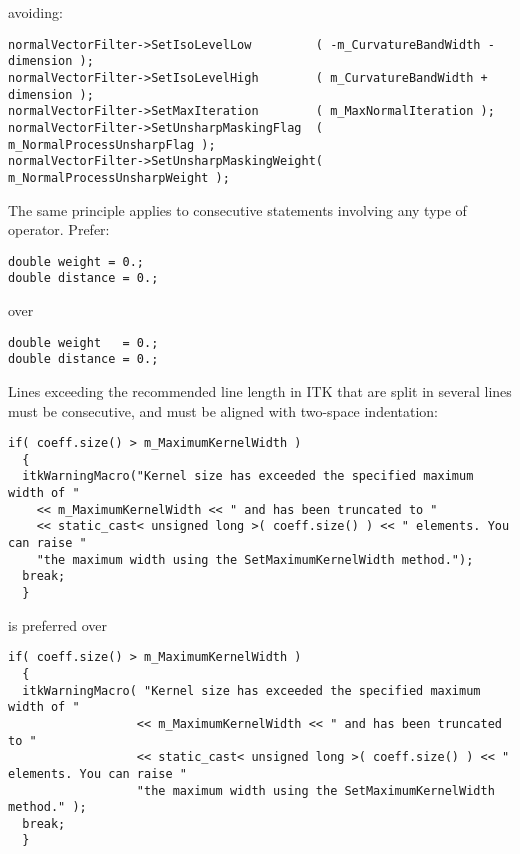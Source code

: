 avoiding:

\small
\begin{verbatim}
normalVectorFilter->SetIsoLevelLow         ( -m_CurvatureBandWidth - dimension );
normalVectorFilter->SetIsoLevelHigh        ( m_CurvatureBandWidth + dimension );
normalVectorFilter->SetMaxIteration        ( m_MaxNormalIteration );
normalVectorFilter->SetUnsharpMaskingFlag  ( m_NormalProcessUnsharpFlag );
normalVectorFilter->SetUnsharpMaskingWeight( m_NormalProcessUnsharpWeight );
\end{verbatim}
\normalsize

The same principle applies to consecutive statements involving any type of
operator. Prefer:

\small
\begin{verbatim}
double weight = 0.;
double distance = 0.;
\end{verbatim}
\normalsize

over

\small
\begin{verbatim}
double weight   = 0.;
double distance = 0.;
\end{verbatim}
\normalsize

Lines exceeding the recommended line length in ITK that are split in several
lines must be consecutive, and must be aligned with two-space indentation:

\small
\begin{verbatim}
if( coeff.size() > m_MaximumKernelWidth )
  {
  itkWarningMacro("Kernel size has exceeded the specified maximum width of "
    << m_MaximumKernelWidth << " and has been truncated to "
    << static_cast< unsigned long >( coeff.size() ) << " elements. You can raise "
    "the maximum width using the SetMaximumKernelWidth method.");
  break;
  }
\end{verbatim}
\normalsize

is preferred over

\small
\begin{verbatim}
if( coeff.size() > m_MaximumKernelWidth )
  {
  itkWarningMacro( "Kernel size has exceeded the specified maximum width of "
                  << m_MaximumKernelWidth << " and has been truncated to "
                  << static_cast< unsigned long >( coeff.size() ) << " elements. You can raise "
                  "the maximum width using the SetMaximumKernelWidth method." );
  break;
  }
\end{verbatim}
\normalsize

